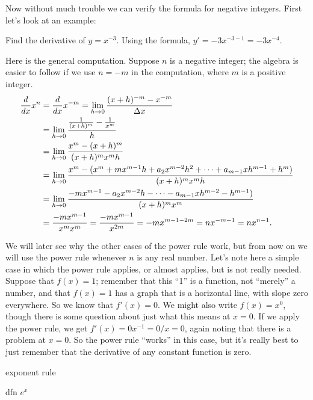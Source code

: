Now without much trouble we can verify the formula for negative
integers. First let's look at an example:

\begin{example} Find the derivative of $y=x^{-3}$. Using the formula,
$y'=-3x^{-3-1}=-3x^{-4}$. 
\end{example}

Here is the general computation. Suppose $n$ is a negative integer;
the algebra is easier to follow if we use $n=-m$ in the computation,
where $m$ is a positive integer.
\begin{align*}
\frac{d}{dx} x^n &= \frac{d}{dx} x^{-m} =
\lim_{ h\to0} {(x+ h)^{-m}-x^{-m}\over \Delta
  x} \\
&=\lim_{ h\to0} { {1\over (x+ h)^m} - {1\over x^m} \over
   h}  \\
&=\lim_{ h\to0} { x^m - (x+ h)^m \over
(x+ h)^m x^m  h}  \\
&=\lim_{ h\to0} { x^m - (x^m + mx^{m-1} h + a_2x^{m-2} h^2+\cdots+
a_{m-1}x h^{m-1} +  h^m)\over
(x+ h)^m x^m  h}  \\
&=\lim_{ h\to0} { -mx^{m-1} - a_2x^{m-2} h-\cdots-
a_{m-1}x h^{m-2} -  h^{m-1})\over
(x+ h)^m x^m}  \\
&={ -mx^{m-1} \over x^mx^m}=
{ -mx^{m-1} \over x^{2m}}=
-mx^{m-1-2m}= nx^{-m-1} = nx^{n-1}. \\
\end{align*}

We will later see why the other cases of the power rule work, but from
now on we will use the power rule whenever $n$ is any real number.
Let's note here a simple case in which the power rule applies, or
almost applies, but is not really needed. Suppose that $f(x)=1$;
remember that this ``1'' is a function, not ``merely'' a number, and
that $f(x)=1$ has a graph that is a horizontal line, with slope zero
everywhere. So we know that $f'(x)=0$. We might also write $f(x)=x^0$,
though there is some question about just what this means at $x=0$. If
we apply the power rule, we get $f'(x)=0x^{-1}=0/x=0$, again noting
that there is a problem at $x=0$. So the power rule ``works'' in this
case, but it's really best to just remember that the derivative of any
constant function is zero.



exponent rule

dfn $e^x$





